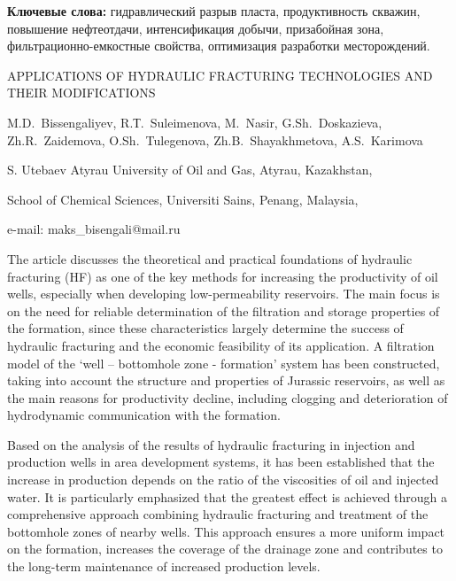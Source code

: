 {\bfseries Ключевые слова:} гидравлический разрыв пласта, продуктивность
скважин, повышение нефтеотдачи, интенсификация добычи, призабойная зона,
фильтрационно-емкостные свойства, оптимизация разработки месторождений.

\begin{header}
APPLICATIONS OF HYDRAULIC FRACTURING TECHNOLOGIES AND THEIR MODIFICATIONS

M.D.~Bissengaliyev\envelope,
R.Т.~Suleimenova,
M.~Nasir,
G.Sh.~Doskazieva,
Zh.R.~Zaidemova,
O.Sh.~Tulegenova,
Zh.B.~Shayakhmetova,
A.S.~Karimova
\end{header}

\begin{affil}
S. Utebaev Atyrau University of Oil and Gas, Atyrau, Kazakhstan,
       
School of Chemical Sciences, Universiti Sains, Penang, Malaysia,

e-mail: maks\_bisengali@mail.ru
\end{affil}

The article discusses the theoretical and practical foundations of
hydraulic fracturing (HF) as one of the key methods for increasing the
productivity of oil wells, especially when developing low-permeability
reservoirs. The main focus is on the need for reliable determination of
the filtration and storage properties of the formation, since these
characteristics largely determine the success of hydraulic fracturing
and the economic feasibility of its application. A filtration model of
the `well -- bottomhole zone - formation' system has been constructed,
taking into account the structure and properties of Jurassic reservoirs,
as well as the main reasons for productivity decline, including clogging
and deterioration of hydrodynamic communication with the formation.

Based on the analysis of the results of hydraulic fracturing in
injection and production wells in area development systems, it has been
established that the increase in production depends on the ratio of the
viscosities of oil and injected water. It is particularly emphasized
that the greatest effect is achieved through a comprehensive approach
combining hydraulic fracturing and treatment of the bottomhole zones of
nearby wells. This approach ensures a more uniform impact on the
formation, increases the coverage of the drainage zone and contributes
to the long-term maintenance of increased production levels.

